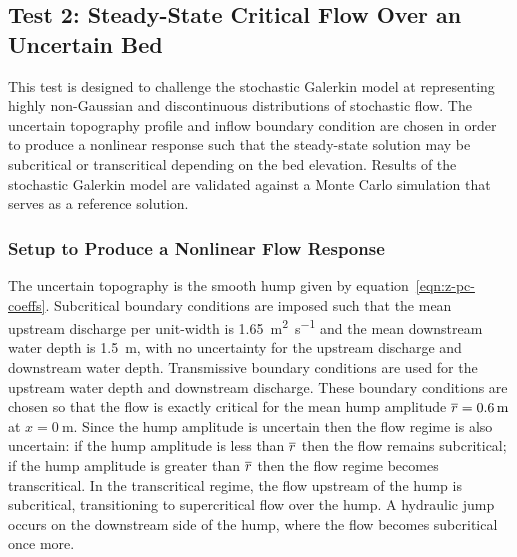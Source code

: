 \subsection{Test 2: Steady-State Critical Flow Over an Uncertain Bed}

This test is designed to challenge the stochastic Galerkin model at representing highly non-Gaussian and discontinuous distributions of stochastic flow.
The uncertain topography profile and inflow boundary condition are chosen in order to produce a nonlinear response such that the steady-state solution may be subcritical or transcritical depending on the bed elevation.
Results of the stochastic Galerkin model are validated against a Monte Carlo simulation that serves as a reference solution.

\subsubsection{Setup to Produce a Nonlinear Flow Response}
The uncertain topography is the smooth hump given by equation~\eqref{eqn:z-pc-coeffs}.
Subcritical boundary conditions are imposed such that the mean upstream discharge per unit-width is \SI{1.65}{\meter\squared\per\second} and the mean downstream water depth is \SI{1.5}{\meter}, with no uncertainty for the upstream discharge and downstream water depth.
Transmissive boundary conditions are used for the upstream water depth and downstream discharge.
These boundary conditions are chosen so that the flow is exactly critical for the mean hump amplitude $\overline{r} = \SI{0.6}{\meter}$ at $x = \SI{0}{\meter}$.
Since the hump amplitude is uncertain then the flow regime is also uncertain: if the hump amplitude is less than $\overline{r}$ then the flow remains subcritical; if the hump amplitude is greater than $\overline{r}$ then the flow regime becomes transcritical.
In the transcritical regime, the flow upstream of the hump is subcritical, transitioning to supercritical flow over the hump.
A hydraulic jump occurs on the downstream side of the hump, where the flow becomes subcritical once more.

